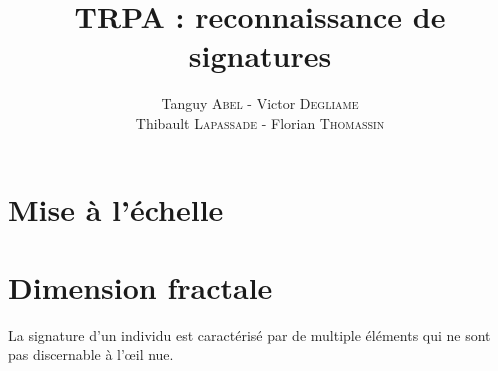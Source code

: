 \documentclass[fontsize=11pt, twoside=no]{scrartcl} %
\begin{document}
\title{TRPA : reconnaissance de signatures}
\author{Tanguy \textsc{Abel} - Victor \textsc{Degliame}\\Thibault \textsc{Lapassade} - Florian \textsc{Thomassin}}
\date{}
\maketitle
\vspace*{-2cm}






\part{Mise à l’échelle}


\part{Dimension fractale}
La signature d'un individu est caractérisé par de multiple éléments qui ne sont pas discernable à l'œil nue.\\
\end{document}

